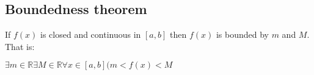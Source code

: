 
\subsection{Boundedness theorem}

If \(f(x)\) is closed and continuous in \([a,b]\) then \(f(x)\) is bounded by \(m\) and \(M\). That is:

\(\exists m \in \mathbb{R} \exists M\in \mathbb{R}\forall x\in [a,b](m<f(x)<M\)

